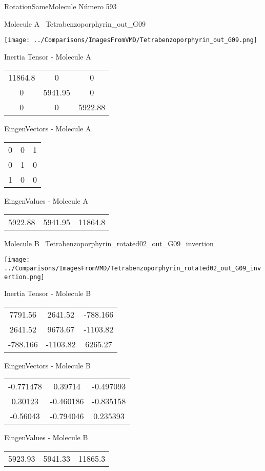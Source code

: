 \vtab[-3cm]
\begin{center}
{\large RotationSameMolecule \tab Número 593}
\end{center}
\begin{multicols}{2}
\begin{center}

Molecule A \
Tetrabenzoporphyrin\_out\_G09

\texttt{[image: ../Comparisons/ImagesFromVMD/Tetrabenzoporphyrin\_out\_G09.png]}

Inertia Tensor - Molecule A \\
\begin{tabular}{|c c c|}
11864.8	 & 	0	 & 	0	 \\
0	 & 	5941.95	 & 	0	 \\
0	 & 	0	 & 	5922.88
\end{tabular}

\vtab
 EingenVectors - Molecule A     \\
\begin{tabular}{|c c c|}
0	 & 	0	 & 	1	 \\
0	 & 	1	 & 	0	 \\
1	 & 	0	 & 	0
\end{tabular}

\vtab
 EingenValues - Molecule A     \\
\begin{tabular}{|c c c|}
5922.88	 & 	5941.95	 & 	11864.8	 \\
\end{tabular}
\columnbreak

Molecule B \
Tetrabenzoporphyrin\_rotated02\_out\_G09\_invertion

\texttt{[image: ../Comparisons/ImagesFromVMD/Tetrabenzoporphyrin\_rotated02\_out\_G09\_invertion.png]}

Inertia Tensor - Molecule B \\
\begin{tabular}{|c c c|}
7791.56	 & 	2641.52	 & 	-788.166	 \\
2641.52	 & 	9673.67	 & 	-1103.82	 \\
-788.166	 & 	-1103.82	 & 	6265.27
\end{tabular}

\vtab
 EingenVectors - Molecule B     \\
\begin{tabular}{|c c c|}
-0.771478	 & 	0.39714	 & 	-0.497093	 \\
0.30123	 & 	-0.460186	 & 	-0.835158	 \\
-0.56043	 & 	-0.794046	 & 	0.235393
\end{tabular}

\vtab
 EingenValues - Molecule B     \\
\begin{tabular}{|c c c|}
5923.93	 & 	5941.33	 & 	11865.3	 \\
\end{tabular}

\end{center}
\end{multicols}

